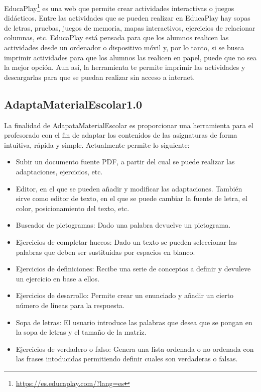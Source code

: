 EducaPlay\footnote{\url{https://es.educaplay.com/?lang=es}} es una web que permite crear actividades interactivas o juegos didácticos. Entre las actividades que se pueden realizar en EducaPlay hay sopas de letras, pruebas, juegos de memoria, mapas interactivos, ejercicios de relacionar columnas, etc. EducaPlay está pensada para que los alumnos realicen las actividades desde un ordenador o dispositivo móvil y, por lo tanto, si se busca imprimir actividades para que los alumnos las realicen en papel, puede que no sea la mejor opción. Aun así, la herramienta te permite imprimir las actividades y descargarlas para que se puedan realizar sin acceso a internet.

\subsection{AdaptaMaterialEscolar1.0}
La finalidad de AdapataMaterialEscolar es proporcionar una herramienta para el profesorado con el fin de adaptar los contenidos de las asignaturas de forma intuitiva, rápida y simple. Actualmente permite lo siguiente:
\begin{itemize}
    \item Subir un documento fuente PDF, a partir del cual se puede realizar las adaptaciones, ejercicios, etc.
    \item Editor, en el que se pueden añadir y modificar las adaptaciones. También sirve como editor de texto, en el que se puede cambiar la fuente de letra, el color, posicionamiento del texto, etc.
    \item Buscador de pictogramas: Dado una palabra devuelve un pictograma.
    \item Ejercicios de completar huecos: Dado un texto se pueden seleccionar las palabras que deben ser sustituidas por espacios en blanco.
    \item Ejercicios de definiciones: Recibe una serie de conceptos a definir y devuleve un ejercicio en base a ellos.
    \item Ejercicios de desarrollo: Permite crear un enunciado y añadir un cierto número de líneas para la respuesta.
    \item Sopa de letras: El usuario introduce las palabras que desea que se pongan en la sopa de letras y el tamaño de la matriz.
    \item Ejercicios de verdadero o falso: Genera una lista ordenada o no ordenada con las frases intoducidas permitiendo definir cuales son verdaderas o falsas.
\end{itemize}

